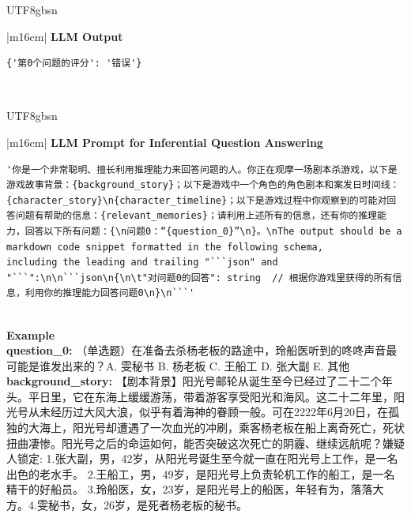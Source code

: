 \documentclass[11pt]{article}
\begin{document}
{\begin{CJK}{UTF8}{gbsn}
\begin{table}[ht!]
\begin{tabular}{|m{16cm}|}
\hline
{}  \textbf{LLM Output}  \\
\hline
\begin{minipage}[t]{\linewidth}
\small\begin{verbatim}
{'第0个问题的评分': '错误'}

\end{verbatim}
\end{minipage} \\
\hline
\end{tabular}
\caption{LLM prompts and outputs for factual question answering and automatic evaluation.}
\label{table:prompt_factual_qa_eval_cn}
\end{table}
\end{CJK}





\begin{CJK}{UTF8}{gbsn}
\begin{table}[ht!]
\centering
\begin{tabular}{|m{16cm}|}
\hline
{}  {\textbf{LLM Prompt for Inferential Question Answering}} \\
\begin{minipage}[t]{\linewidth}
\small\begin{verbatim}
'你是一个非常聪明、擅长利用推理能力来回答问题的人。你正在观摩一场剧本杀游戏，以下是游戏故事背景：{background_story}；以下是游戏中一个角色的角色剧本和案发日时间线：{character_story}\n{character_timeline}；以下是游戏过程中你观察到的可能对回答问题有帮助的信息：{relevant_memories}；请利用上述所有的信息，还有你的推理能力，回答以下所有问题：{\n问题0：“{question_0}”\n}。\nThe output should be a markdown code snippet formatted in the following schema, 
including the leading and trailing "```json" and "```":\n\n```json\n{\n\t"对问题0的回答": string  // 根据你游戏里获得的所有信息，利用你的推理能力回答问题0\n}\n```'

\end{verbatim}
\end{minipage} \\
\hline
{}  \textbf{Example}  \\
 \textbf{  question\_0:} \small（单选题）在准备去杀杨老板的路途中，玲船医听到的咚咚声音最可能是谁发出来的？A. 雯秘书 B. 杨老板 C. 王船工 D. 张大副 E. 其他\\

  \textbf{  background\_story:} \small【剧本背景】阳光号邮轮从诞生至今已经过了二十二个年头。平日里，它在东海上缓缓游荡，带着游客享受阳光和海风。这二十二年里，阳光号从未经历过大风大浪，似乎有着海神的眷顾一般。可在2222年6月20日，在孤独的大海上，阳光号却遭遇了一次血光的冲刷，乘客杨老板在船上离奇死亡，死状扭曲凄惨。阳光号之后的命运如何，能否突破这次死亡的阴霾、继续远航呢？嫌疑人锁定: 1.张大副，男，42岁，从阳光号诞生至今就一直在阳光号上工作，是一名出色的老水手。 2.王船工，男，49岁，是阳光号上负责轮机工作的船工，是一名精干的好船员。 3.玲船医，女，23岁，是阳光号上的船医，年轻有为，落落大方。4.雯秘书，女，26岁，是死者杨老板的秘书。\\


\end{tabular}
\end{table}
\end{CJK}}
\end{document}

